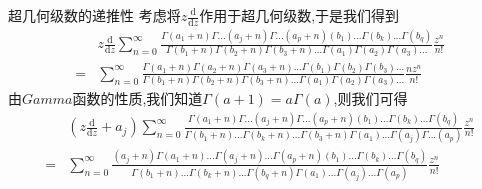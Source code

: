 \documentclass[zihao=-4,a4paper]{ctexart}
\begin{document}
\begin{mtheorem}{超几何级数的递推性}
	考虑将$ {z} \frac{ \text{d} }{ \text{d}{z} } $作用于超几何级数,于是我们得到
	\begin{equation*}
		\begin{split}
			&{z} \frac{ \text{d} }{ \text{d} {z} } \sum^{\infty}_{n=0} \frac{ {\Gamma} { \left( {a}_{1} + {n} \right) } {\Gamma} ... { \left( {a}_{j} + {n} \right) } {\Gamma} ... { \left( {a}_{p} + {n} \right) } { \left( {b}_{1} \right) } ... {\Gamma} { \left( {b}_{k} \right) } ... {\Gamma} { \left( {b}_{q} \right) } } { {\Gamma} { \left( {b}_{1} + {n} \right) } {\Gamma} { \left( {b}_{2} + {n} \right) } {\Gamma} { \left( {b}_{3} + {n} \right) } ... {\Gamma} { \left( {a}_{1} \right) } {\Gamma} { { \left( {a}_{2} \right) } } {\Gamma} { { \left( {a}_{3} \right) } } ... } \frac{ {z}^{n} }{ {n} ! }\\
			=&\sum^{\infty}_{n=0} \frac{ {\Gamma} { \left( {a}_{1} + {n} \right) } {\Gamma} { \left( {a}_{2} + {n} \right) } {\Gamma} { \left( {a}_{3} + {n} \right) } ... {\Gamma} { \left( {b}_{1} \right) } {\Gamma} { \left( {b}_{2} \right) } {\Gamma} { \left( {b}_{3} \right) } ... } { {\Gamma} { \left( {b}_{1} + {n} \right) } {\Gamma} { \left( {b}_{2} + {n} \right) } {\Gamma} { \left( {b}_{3} + {n} \right) } ... {\Gamma} { \left( {a}_{1} \right) } {\Gamma} { \left( {a}_{2} \right) } {\Gamma} { \left( {a}_{3} \right) } ... } \frac{ {n} {z}^{n} }{ {n} ! }
		\end{split}
	\end{equation*}
	由$Gamma$函数的性质,我们知道$ {\Gamma} \left( {a} + 1 \right) = a {\Gamma} \left( {a} \right)$,则我们可得
	\begin{equation*}
		\begin{split}
			&\left( {z} \frac{ \text{d} }{ \text{d} {z} } + {a}_{j} \right) \sum^{\infty}_{n=0} \frac{ {\Gamma} { \left( {a}_{1} + {n} \right) } {\Gamma} ... { \left( {a}_{j} + {n} \right) } {\Gamma} ... { \left( {a}_{p} + {n} \right) } { \left( {b}_{1} \right) } ... {\Gamma} { \left( {b}_{k} \right) } ... {\Gamma} { \left( {b}_{q} \right) } } { {\Gamma} { \left( {b}_{1} + {n} \right) } ... {\Gamma} { \left( {b}_{k} + {n} \right) } ... {\Gamma} { \left( {b}_{3} + {n} \right) } {\Gamma} { \left( {a}_{1} \right) } ... {\Gamma} { \left( {a}_{j} \right) } {\Gamma} ... { \left( {a}_{p} \right) } } \frac{ {z}^{n} }{ {n} ! }\\
			=&\sum^{\infty}_{n=0} \frac{ { \left( {a}_{j} + {n} \right) } {\Gamma} { \left( {a}_{1} + {n} \right) } ... {\Gamma} { \left( {a}_{j} + {n} \right) } ... {\Gamma} { \left( {a}_{p} + {n} \right) } { \left( {b}_{1} \right) } ... {\Gamma} { \left( {b}_{k} \right) } ... {\Gamma} { \left( {b}_{q} \right) } } { {\Gamma} { \left( {b}_{1} + {n} \right) } ... {\Gamma} { \left( {b}_{k} + {n} \right) } ... {\Gamma} { \left( {b}_{q} + {n} \right) } {\Gamma} { \left( {a}_{1} \right) } ... {\Gamma} { \left( {a}_{j} \right) } ... {\Gamma} { \left( {a}_{p} \right) } } \frac{ {z}^{n} }{ {n} ! }\\

\end{split}
\end{equation*}
\end{mtheorem}
\end{document}
